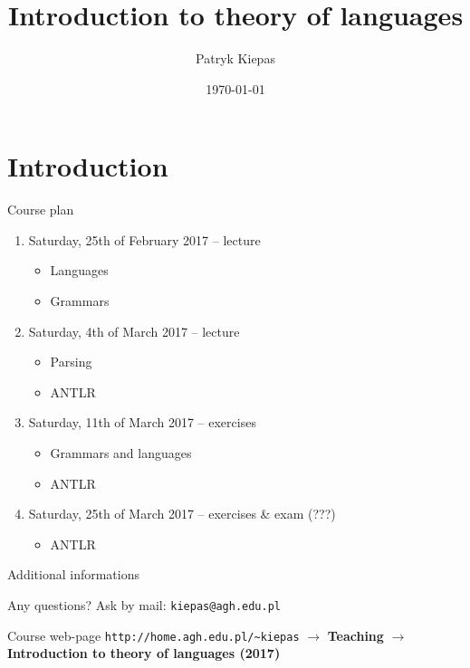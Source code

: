 \documentclass{beamer}
\title[Theory of languages]{Introduction to theory of languages}
\author{Patryk Kiepas}
\institute{MINES ParisTech \\ AGH University Of Science and Technology \\ THALES}
\date{\today}
\begin{document}
\begin{frame}
  \titlepage
\end{frame}


\section{Introduction}

\begin{frame}{Course plan}

\begin{enumerate}
\item Saturday, 25th of February 2017 -- lecture
\begin{itemize}
\item Languages
\item Grammars
\end{itemize}
\item Saturday, 4th of March 2017 -- lecture
\begin{itemize}
\item Parsing
\item ANTLR
\end{itemize}
\item Saturday, 11th of March 2017 -- exercises
\begin{itemize}
\item Grammars and languages
\item ANTLR
\end{itemize}
\item Saturday, 25th of March 2017 -- exercises \& exam (???)
\begin{itemize}
\item ANTLR
\end{itemize}
\end{enumerate}

\end{frame}

\begin{frame}[fragile]{Additional informations}
\begin{alertblock}{Any questions?}
Ask by mail: \verb|kiepas@agh.edu.pl|
\end{alertblock}

\begin{alertblock}{Course web-page}
\verb|http://home.agh.edu.pl/~kiepas| $\rightarrow$ \textbf{Teaching} $\rightarrow$ \textbf{Introduction to theory of languages (2017)}
\end{alertblock}
\end{frame}
\end{document}
